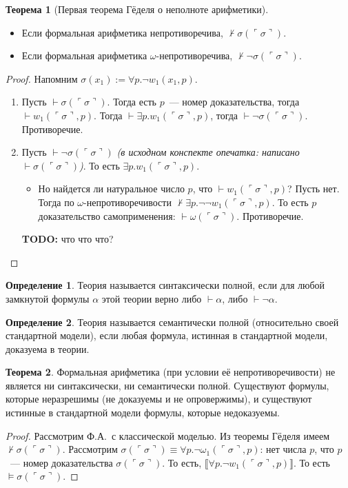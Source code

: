 \documentclass[a4paper,11pt]{article}
\theoremstyle{definition}
\newtheorem*{thm}{Теорема}
\newtheorem*{dfn}{Определение}
\newcommand{\proves}{\vdash}
\newcommand{\gn}[1]{\ulcorner #1 \urcorner}
\newcommand{\todo}[1]{\textbf{TODO:} #1}
\begin{document}
\begin{thm}[Первая теорема Гёделя о неполноте арифметики]
\begin{itemize}
\item Если формальная арифметика непротиворечива, $\nvdash \sigma(\gn{\sigma})$.
\item Если формальная арифметика $\omega$-непротиворечива, $\nvdash
  \neg\sigma(\gn{\sigma})$.
\end{itemize}
\end{thm}
\begin{proof}
Напомним $\sigma(x_1) := \forall p.\neg w_1(x_1, p)$.
\begin{enumerate}
\item Пусть $\proves \sigma(\gn{\sigma})$. Тогда есть $p$~--- номер
  доказательства, тогда $\proves w_1(\gn{\sigma}, p)$. Тогда $\proves \exists
  p.w_1(\gn{\sigma}, p)$, тогда $\proves \neg\sigma(\gn{\sigma})$. Противоречие.
\item Пусть $\proves \neg\sigma(\gn{\sigma})$ \emph{(в исходном конспекте
  опечатка: написано $\proves \sigma(\gn{\sigma})$)}. То есть $\exists p.w_1(\gn{\sigma}, p)$.
  \begin{itemize}
  \item Но найдется ли натуральное число $p$, что $\proves w_1(\gn{\sigma}, p)$?
    Пусть нет. Тогда по $\omega$-непротиворечивости $\nvdash \exists
    p.\neg\neg w_1(\gn{\sigma}, p)$. То есть $p$ доказательство самоприменения:
    $\proves \omega(\gn{\sigma})$. Противоречие.
  \end{itemize}
  \todo{что что что?}
\end{enumerate}
\end{proof}

\begin{dfn}
Теория называется синтаксически полной, если для любой замкнутой формулы
$\alpha$ этой теории верно либо $\proves \alpha$, либо $\proves \neg\alpha$.
\end{dfn}
\begin{dfn}
Теория называется семантически полной (относительно своей стандартной модели),
если любая формула, истинная в стандартной модели, доказуема в теории.
\end{dfn}
\begin{thm}
Формальная арифметика (при условии её непротиворечивости) не является ни
синтаксически, ни семантически полной. Существуют формулы, которые неразрешимы
(не доказуемы и не опровержимы), и существуют истинные в стандартной модели
формулы, которые недоказуемы.
\end{thm}
\begin{proof}
Рассмотрим Ф.А.\ с классической моделью. Из теоремы Гёделя имеем $\nvdash
\sigma(\gn{\sigma})$. Рассмотрим $\sigma(\gn{\sigma}) \equiv \forall
p.\neg\omega_1(\gn{\sigma}, p)$: нет числа $p$, что $p$~--- номер доказательства
$\sigma(\gn{\sigma})$. То есть, $\llbracket\forall p.\neg w_1(\gn{\sigma},
p)\rrbracket$. То есть $\models \sigma(\gn{\sigma})$.
\end{proof}
\end{document}
